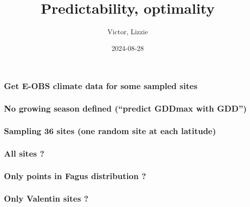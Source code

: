 \documentclass[
]{article}
\title{Predictability, optimality}
\author{Victor, Lizzie}
\date{2024-08-28}
\begin{document}
\maketitle

\hypertarget{get-e-obs-climate-data-for-some-sampled-sites}{%
\subsubsection{Get E-OBS climate data for some sampled
sites}\label{get-e-obs-climate-data-for-some-sampled-sites}}



\hypertarget{no-growing-season-defined-predict-gddmax-with-gdd}{%
\subsubsection{No growing season defined (``predict GDDmax with
GDD'')}\label{no-growing-season-defined-predict-gddmax-with-gdd}}





\hypertarget{sampling-36-sites-one-random-site-at-each-latitude}{%
\subsubsection{Sampling 36 sites (one random site at each
latitude)}\label{sampling-36-sites-one-random-site-at-each-latitude}}

\hypertarget{all-sites}{%
\subsubsection{All sites ?}\label{all-sites}}

\hypertarget{only-points-in-fagus-distribution}{%
\subsubsection{Only points in Fagus distribution
?}\label{only-points-in-fagus-distribution}}

\hypertarget{only-valentin-sites}{%
\subsubsection{Only Valentin sites ?}\label{only-valentin-sites}}
\end{document}
